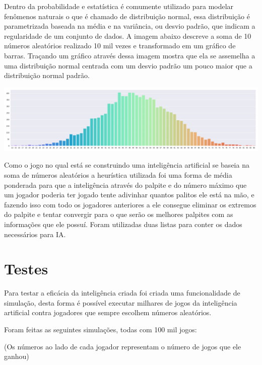 \documentclass{article}
\begin{document}
Dentro da probabilidade e estatística é comumente utilizado para modelar fenômenos naturais o que é chamado de distribuição normal, essa distribuição é parametrizada baseada na média e na variância, ou desvio padrão, que indicam a regularidade de um conjunto de dados. A imagem abaixo descreve a soma de 10 números aleatórios realizado 10 mil vezes e transformado em um gráfico de barras. Traçando um gráfico através dessa imagem mostra que ela se assemelha a uma distribuição normal centrada com um desvio padrão um pouco maior que a distribuição normal padrão.

\includegraphics[width=\textwidth]{soma_de_randoms}

Como o jogo no qual está se construindo uma inteligência artificial se baseia na soma de números aleatórios a heurística utilizada foi uma forma de média ponderada para que a inteligência através do palpite e do número máximo que um jogador poderia ter jogado tente adivinhar quantos palitos ele está na mão, e fazendo isso com todo os jogadores anteriores a ele consegue eliminar os extremos do palpite e tentar convergir para o que serão os melhores palpites com as informações que ele possuí. Foram utilizadas duas listas para conter os dados necessários para IA.

\section{Testes}

Para testar a eficácia da inteligência criada foi criada uma funcionalidade de simulação, desta forma é possível executar milhares de jogos da inteligência artificial contra jogadores que sempre escolhem números aleatórios.

Foram feitas as seguintes simulações, todas com 100 mil jogos:

(Os números ao lado de cada jogador representam o número de jogos que ele ganhou)
\end{document}
